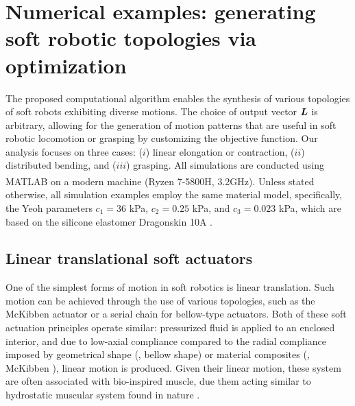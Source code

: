 \newpage
\section[Numerical examples: generating soft robotic topologies]{Numerical examples: generating soft robotic topologies via optimization}
\label{sec:C1:results}
The proposed computational algorithm enables the synthesis of various topologies of soft robots exhibiting diverse motions. The choice of output vector ${\boldsymbol{L}}$ is arbitrary, allowing for the generation of motion patterns that are useful in soft robotic locomotion or grasping by customizing the objective function. Our analysis focuses on three cases: ($i$) linear elongation or contraction, ($ii$) distributed bending, and ($iii$) grasping. All simulations are conducted using MATLAB\textsuperscript{\scriptsize\textregistered} on a modern machine (Ryzen 7-5800H, 3.2GHz). Unless stated otherwise, all simulation examples employ the same material model, specifically, the Yeoh parameters $c_1 = 36$ kPa, $c_2 = 0.25$ kPa, and $c_3 = 0.023$ kPa, which are based on the silicone elastomer Dragonskin 10A \cite{Xavier2022Jun}.

\subsection{Linear translational soft actuators}
One of the simplest forms of motion in soft robotics is linear translation. Such motion can be achieved through the use of various topologies, such as the McKibben actuator or a serial chain for bellow-type actuators. Both of these soft actuation principles operate similar: pressurized fluid is applied to an enclosed interior, and due to low-axial compliance compared to the radial compliance imposed by geometrical shape (\eg, bellow shape) or material composites (\eg, McKibben \cite{Paynter1974,Paynter1988}), linear motion is produced.  Given their linear motion, these system are often associated with bio-inspired muscle, due them acting similar to hydrostatic muscular system found in nature \cite{Kier1985}. 
 

